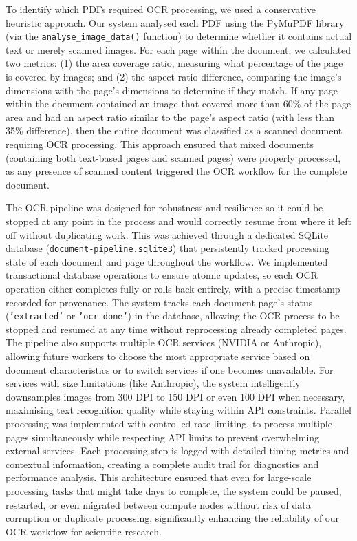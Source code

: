 \documentclass[12pt]{article}
\begin{document}
To identify which PDFs required OCR processing,
we used a conservative heuristic approach.
Our system analysed each PDF using the PyMuPDF library (via the {\tt analyse\_image\_data()} function) 
to determine whether it contains actual text or merely scanned images.
For each page within the document, we calculated two metrics:
(1) the area coverage ratio, measuring what percentage of the page is covered by images;
and (2) the aspect ratio difference, comparing the image's dimensions with the page's dimensions to determine if they match.
If any page within the document contained an image that
covered more than 60\% of the page area and had an aspect ratio similar to the page's aspect ratio 
(with less than 35\% difference),
then the entire document was classified as a scanned document requiring OCR processing. 
This approach ensured that mixed documents (containing both text-based pages and scanned pages) were properly processed, 
as any presence of scanned content triggered the OCR workflow for the complete document.

The OCR pipeline was designed for robustness and resilience
so it could be stopped at any point in the process 
and would correctly resume from where it left off without duplicating work.
This was achieved through a dedicated SQLite database ({\tt document-pipeline.sqlite3}) 
that persistently tracked processing state of each document and page throughout the workflow.
We implemented transactional database operations to ensure atomic updates,
so each OCR operation either completes fully or rolls back entirely, with a precise timestamp recorded for provenance.
The system tracks each document page's status ({\tt 'extracted'} or {\tt 'ocr-done'}) in the database, 
allowing the OCR process to be stopped and resumed at any time without reprocessing already completed pages.
The pipeline also supports multiple OCR services (NVIDIA or Anthropic), 
allowing future workers to choose the most appropriate service based on document characteristics 
or to switch services if one becomes unavailable.
For services with size limitations (like Anthropic), 
the system intelligently downsamples images from 300 DPI to 150 DPI or even 100 DPI when necessary, 
maximising text recognition quality while staying within API constraints.
Parallel processing was implemented with controlled rate limiting, 
to process multiple pages simultaneously while respecting API limits to prevent overwhelming external services.
Each processing step is logged with detailed timing metrics and contextual information, 
creating a complete audit trail for diagnostics and performance analysis.
This architecture ensured that even for large-scale processing tasks that might take days to complete, 
the system could be paused, restarted, or even migrated between compute nodes without risk of data corruption or duplicate
processing, significantly enhancing the reliability of our OCR workflow for scientific research.
\end{document}
